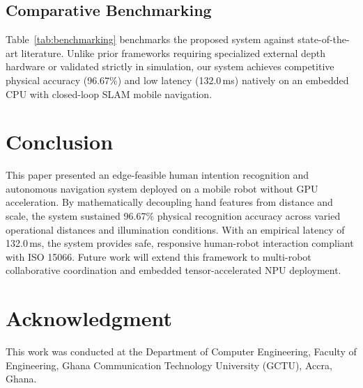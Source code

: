\documentclass[conference]{IEEEtran}
\begin{document}
\subsection{Comparative Benchmarking}
Table~\ref{tab:benchmarking} benchmarks the proposed system against state-of-the-art literature. Unlike prior frameworks requiring specialized external depth hardware or validated strictly in simulation, our system achieves competitive physical accuracy (96.67\%) and low latency (132.0\,ms) natively on an embedded CPU with closed-loop SLAM mobile navigation.

\begin{table}[t]
\centering
\caption{Comparative Benchmarking Against Prior Intention Frameworks}
\label{tab:benchmarking}
\end{table}

\section{Conclusion}
This paper presented an edge-feasible human intention recognition and autonomous navigation system deployed on a mobile robot without GPU acceleration. By mathematically decoupling hand features from distance and scale, the system sustained 96.67\% physical recognition accuracy across varied operational distances and illumination conditions. With an empirical latency of 132.0\,ms, the system provides safe, responsive human-robot interaction compliant with ISO 15066. Future work will extend this framework to multi-robot collaborative coordination and embedded tensor-accelerated NPU deployment.

\section*{Acknowledgment}
This work was conducted at the Department of Computer Engineering, Faculty of Engineering, Ghana Communication Technology University (GCTU), Accra, Ghana.



\end{document}
